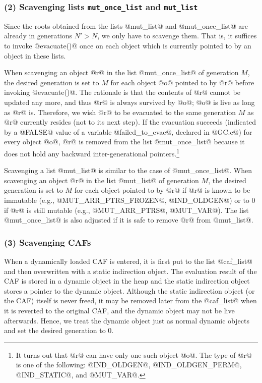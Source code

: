 \documentclass{article}
\begin{document}
\subsubsection{(2) Scavenging lists {\tt mut\_once\_list} and {\tt mut\_list}}

Since the roots obtained from the lists @mut_list@ and @mut_once_list@ are
already in generations $N' > N$, we only have to scavenge them.
That is, it suffices to invoke @evacuate()@ once on each object 
which is currently pointed to by an object in these lists. 

When scavenging an object @r@ in the list @mut_once_list@ of generation $M$,
the desired generation is set to $M$ for each object @o@ pointed
to by @r@ before invoking @evacuate()@. 
The rationale is that the contents of @r@ cannot be updated any more,
and thus @r@ is always survived by @o@; @o@ is live as long as @r@ is.
Therefore, we wish @r@ to be evacuated to the same generation $M$ as @r@
currently resides (not to its next step).
If the evacuation succeeds (indicated by a @FALSE@ value of a variable
@failed_to_evac@, declared in @GC.c@) for every object @o@, @r@ is removed 
from the list @mut_once_list@ because it does not hold any backward 
inter-generational pointers.\footnote{It turns out that @r@ can have only
one such object @o@. The type of @r@ is one of the following:
@IND\_OLDGEN@, @IND\_OLDGEN\_PERM@, @IND\_STATIC@, and @MUT\_VAR@.}

Scavenging a list @mut_list@ is similar to the case of @mut_once_list@.
When scavenging an object @r@ in the list @mut_list@ of generation $M$,
the desired generation is set to $M$ for each object pointed to by @r@
if @r@ is known to be immutable (e.g., @MUT_ARR_PTRS_FROZEN@, 
@IND_OLDGEN@)
or to $0$ if @r@ is still mutable (e.g., @MUT_ARR_PTRS@, @MUT_VAR@).
The list @mut_once_list@ is also adjusted if it is safe to remove @r@ from
@mut_list@. 

\subsubsection{(3) Scavenging CAFs}

When a dynamically loaded CAF is entered, it is first put to the list 
@caf_list@ and then overwritten with a static indirection object.
The evaluation result of the CAF is stored in a dynamic object in the heap
and the static indirection object stores a pointer to the dynamic object.
Although the static indirection object (or the CAF) itself is never freed, 
it may be removed later from the @caf_list@ when it is reverted to the 
original CAF, and the dynamic object may not be live afterwards.
Hence, we treat the dynamic object just as normal dynamic objects and
set the desired generation to $0$.
\end{document}
